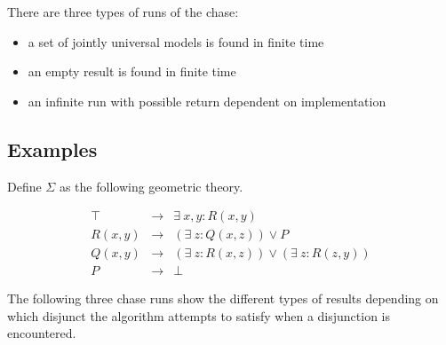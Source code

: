 		There are three types of runs of the chase:
		\begin{itemize}
		\item a set of jointly universal models is found in finite time
		\item an empty result is found in finite time
		\item an infinite run with possible return dependent on implementation
		\end{itemize}

	\subsection{Examples}

		Define $\Sigma$ as the following geometric theory.

		\begin{eqnarray}
			\label{eqn:chase1}
			\top    &  \to  &  \exists\ x,y : R(x,y)                             \\
			\label{eqn:chase2}
			R(x,y)  &  \to  &  (\exists\ z : Q(x,z)) \vee P                      \\
			\label{eqn:chase3}
			Q(x,y)  &  \to  &  (\exists\ z : R(x,z)) \vee (\exists\ z : R(z,y))  \\
			\label{eqn:chase4}
			P       &  \to  &  \bot
		\end{eqnarray}

		The following three chase runs show the different types of results
		depending on which disjunct the algorithm attempts to satisfy when a
		disjunction is encountered.

